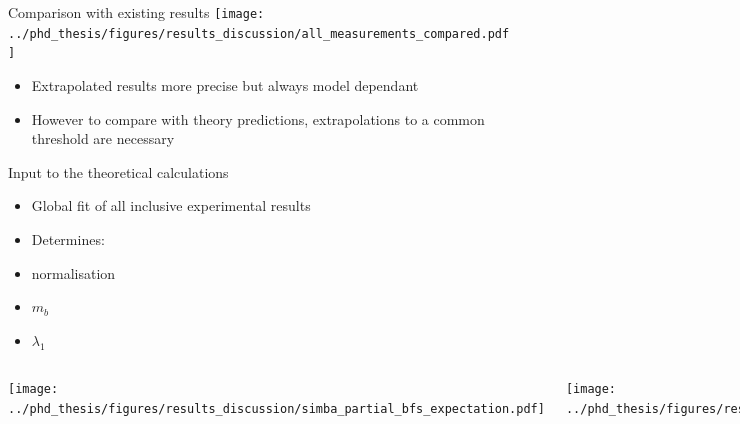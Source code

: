 \documentclass[xcolor=dvipsnames]{beamer}
\begin{document}
\begin{frame}{Comparison with existing results}
\centering\scriptsize
      \texttt{[image: ../phd\_thesis/figures/results\_discussion/all\_measurements\_compared.pdf]}

      \begin{itemize}
         \item Extrapolated results more precise but always model dependant
         \item However to compare with theory predictions, extrapolations to a common threshold are necessary
      \end{itemize}
      
\end{frame}

\begin{frame}{Input to the theoretical calculations}

   \begin{itemize}
      \item Global fit of all inclusive experimental results
      \item Determines:
      \item[\ra] normalisation
      \item[\ra] $m_b$
      \item[\ra] $\lambda_1$  
   \end{itemize}
\begin{columns}
   \texttt{[image: ../phd\_thesis/figures/results\_discussion/simba\_partial\_bfs\_expectation.pdf]}

   \texttt{[image: ../phd\_thesis/figures/results\_discussion/C7incl\_mb\_la055\_henrikas.pdf]}

\end{columns}


\end{frame}   
\end{document}
